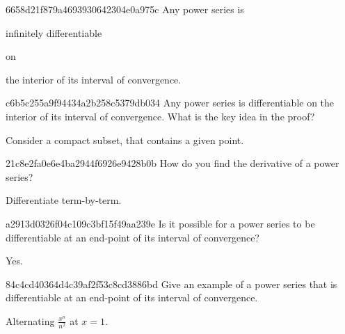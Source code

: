 \begin{note}{6658d21f879a4693930642304e0a975c}
    Any power series is \begin{icloze}{2}infinitely differentiable\end{icloze} on \begin{icloze}{1}the interior of its interval of convergence.\end{icloze}
\end{note}

\begin{note}{c6b5c255a9f94434a2b258c5379db034}
    Any power series is differentiable on the interior of its interval of convergence.
    What is the key idea in the proof?

    \begin{cloze}{1}
        Consider a compact subset, that contains a given point.
    \end{cloze}
\end{note}

\begin{note}{21c8e2fa0e6e4ba2944f6926e9428b0b}
    How do you find the derivative of a power series?

    \begin{cloze}{1}
        Differentiate term-by-term.
    \end{cloze}
\end{note}

\begin{note}{a2913d0326f04c109c3bf15f49aa239e}
    Is it possible for a power series to be differentiable at an end-point of its interval of convergence?

    \begin{cloze}{1}
        Yes.
    \end{cloze}
\end{note}

\begin{note}{84c4cd40364d4c39af2f53c8cd3886bd}
    Give an example of a power series that is differentiable at an end-point of its interval of convergence.

    \begin{cloze}{1}
        Alternating \({ \frac{x^{n}}{n^2} }\) at \({ x = 1 }\).
    \end{cloze}
\end{note}


